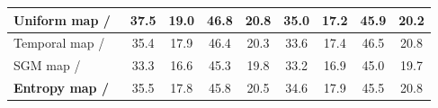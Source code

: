 \begin{table}[H]
\begin{tabular}{@{}l cc cc cc cc@{}}
 Uniform map /~\cite{yadav2023offline}          & 37.5 & 19.0 & 46.8 & 20.8 & 35.0 & 17.2 & 45.9 & 20.2 \\
 \midrule
Temporal map  /~\cite{yadav2023offline}         & 35.4 & 17.9 & 46.4 & 20.3 & 33.6 & 17.4 & 46.5 & 20.8 \\
SGM map /~\cite{yadav2023offline}               & 33.3 & 16.6 & 45.3 & 19.8 & 33.2 & 16.9 & 45.0 & 19.7 \\
\textbf{Entropy map  /~\cite{yadav2023offline}}    & 35.5 & 17.8 & 45.8 & 20.5 & 34.6 & 17.9 & 45.5 & 20.8 \\
\bottomrule
\end{tabular}
\end{table}



